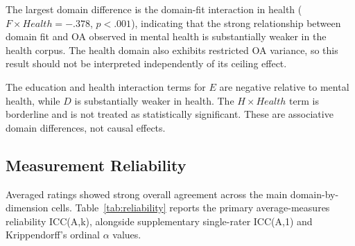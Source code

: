 \documentclass[manuscript,review,anonymous]{acmart}
\begin{document}
The largest domain difference is the domain-fit interaction in health ($F\times Health=-.378$, $p<.001$), indicating that the strong relationship between domain fit and OA observed in mental health is substantially weaker in the health corpus. The health domain also exhibits restricted OA variance, so this result should not be interpreted independently of its ceiling effect.

The education and health interaction terms for $E$ are negative relative to mental health, while $D$ is substantially weaker in health. The $H\times Health$ term is borderline and is not treated as statistically significant. These are associative domain differences, not causal effects.

\subsection{Measurement Reliability}

Averaged ratings showed strong overall agreement across the main domain-by-dimension cells. Table~\ref{tab:reliability} reports the primary average-measures reliability ICC(A,k), alongside supplementary single-rater ICC(A,1) and Krippendorff's ordinal $\alpha$ values.
\end{document}
